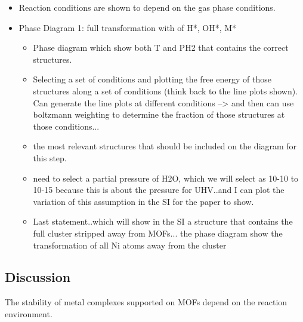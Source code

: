 \documentclass[journal=jctcce,manuscript=article]{achemso}
\begin{document}
\begin{itemize}

    \item Reaction conditions are shown to depend on the gas phase conditions. 
    \item Phase Diagram 1: full transformation with of H*, OH*, M* 
    \begin{itemize}
        \item Phase diagram which show both T and PH2 that contains the correct structures. 
        \item Selecting a set of conditions and plotting the free energy of those structures along a set of conditions (think back to the line plots shown). Can generate the line plots at different conditions --> and then can use boltzmann weighting to determine the fraction of those structures at those conditions... 
        \item the most relevant structures that should be included on the diagram for this step. 
        \item need to select a partial pressure of H2O, which we will select as 10-10 to 10-15 because this is about the pressure for UHV..and I can plot the variation of this assumption in the SI for the paper to show. 
        \item Last statement..which will show in the SI a structure that contains the full cluster stripped away from MOFs... the phase diagram show the transformation of all Ni atoms away from the cluster
    \end{itemize}
\end{itemize}

\newpage
\subsection{Discussion}
The stability of metal complexes supported on MOFs depend on the reaction environment. 

\end{document}

